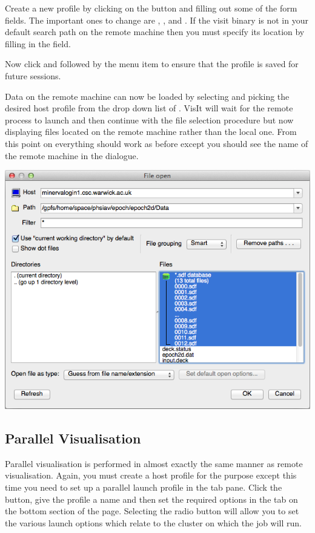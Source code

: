   Create a new profile by clicking on the  button and filling
  out some of the form fields. The important ones to change are , ,  and .
  If the visit binary is not in your default search path on the remote
  machine then you must specify its location by filling in the
   field.

  Now click  and  followed by
  the  menu item to
  ensure that the profile is saved for future sessions.

  Data on the remote machine can now be loaded by selecting  and picking the desired host profile
  from the drop down list of . VisIt will wait for the
  remote process to launch and then continue with the file selection
  procedure but now displaying files located on the remote machine
  rather than the local one. From this point on everything should work
  as before except you should see the name of the remote machine in the
   dialogue. 

  \begin{center}
    \includegraphics[width=0.8\linewidth]{images/visit_host_files}
  \end{center}

\subsection{Parallel Visualisation}
  Parallel visualisation is performed in almost exactly the same manner
  as remote visualisation. Again, you must create a host profile for the
  purpose except this time you need to set up a parallel launch profile in
  the  tab pane.
  Click the  button, give the profile a name and then set the
  required options in the  tab on the bottom section of the page.
  Selecting the  radio button will allow you to
  set the various launch options which relate to the cluster on which the job
  will run.

